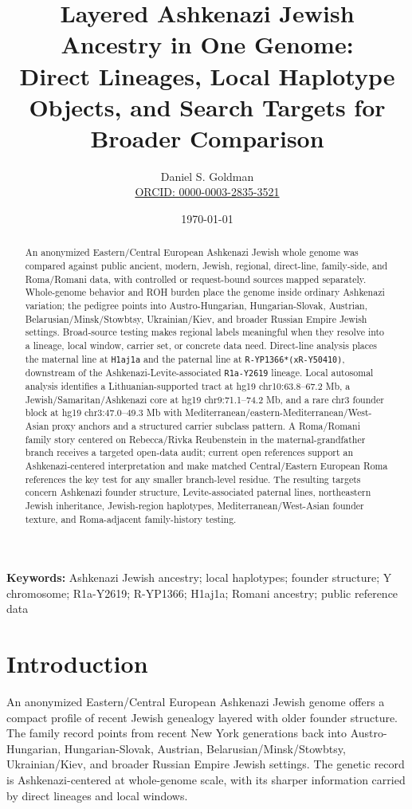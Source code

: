 \documentclass[11pt]{article}
\title{Layered Ashkenazi Jewish Ancestry in One Genome:\\Direct Lineages, Local Haplotype Objects, and Search Targets for Broader Comparison}
\author{Daniel S. Goldman\\\href{https://orcid.org/0000-0003-2835-3521}{ORCID: 0000-0003-2835-3521}}
\date{\today}
\begin{document}
\maketitle

\begin{abstract}
An anonymized Eastern/Central European Ashkenazi Jewish whole genome was compared against public ancient, modern, Jewish, regional, direct-line, family-side, and Roma/Romani data, with controlled or request-bound sources mapped separately. Whole-genome behavior and ROH burden place the genome inside ordinary Ashkenazi variation; the pedigree points into Austro-Hungarian, Hungarian-Slovak, Austrian, Belarusian/Minsk/Stowbtsy, Ukrainian/Kiev, and broader Russian Empire Jewish settings. Broad-source testing makes regional labels meaningful when they resolve into a lineage, local window, carrier set, or concrete data need. Direct-line analysis places the maternal line at \texttt{H1aj1a} and the paternal line at \texttt{R-YP1366*(xR-Y50410)}, downstream of the Ashkenazi-Levite-associated \texttt{R1a-Y2619} lineage. Local autosomal analysis identifies a Lithuanian-supported tract at hg19 chr10:63.8--67.2 Mb, a Jewish/Samaritan/Ashkenazi core at hg19 chr9:71.1--74.2 Mb, and a rare chr3 founder block at hg19 chr3:47.0--49.3 Mb with Mediterranean/eastern-Mediterranean/West-Asian proxy anchors and a structured carrier subclass pattern. A Roma/Romani family story centered on Rebecca/Rivka Reubenstein in the maternal-grandfather branch receives a targeted open-data audit; current open references support an Ashkenazi-centered interpretation and make matched Central/Eastern European Roma references the key test for any smaller branch-level residue. The resulting targets concern Ashkenazi founder structure, Levite-associated paternal lines, northeastern Jewish inheritance, Jewish-region haplotypes, Mediterranean/West-Asian founder texture, and Roma-adjacent family-history testing.
\end{abstract}

\noindent\textbf{Keywords:} Ashkenazi Jewish ancestry; local haplotypes; founder structure; Y chromosome; R1a-Y2619; R-YP1366; H1aj1a; Romani ancestry; public reference data

\section{Introduction}

An anonymized Eastern/Central European Ashkenazi Jewish genome offers a compact profile of recent Jewish genealogy layered with older founder structure. The family record points from recent New York generations back into Austro-Hungarian, Hungarian-Slovak, Austrian, Belarusian/Minsk/Stowbtsy, Ukrainian/Kiev, and broader Russian Empire Jewish settings. The genetic record is Ashkenazi-centered at whole-genome scale, with its sharper information carried by direct lineages and local windows.
\end{document}
